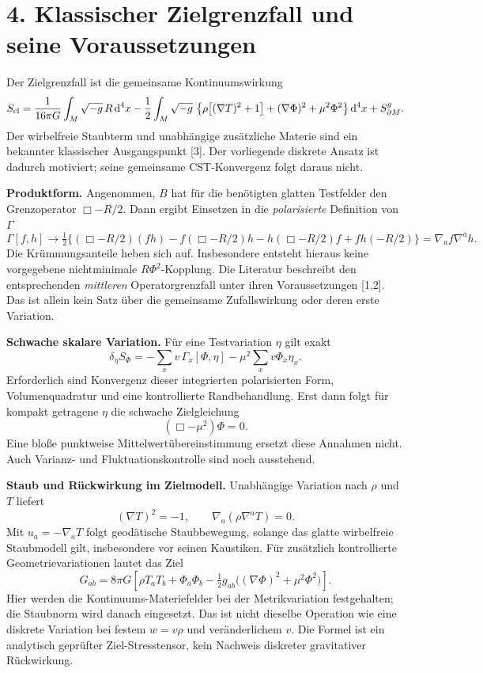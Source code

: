 \documentclass[10pt,a4paper]{article}
\newcommand{\dd}{\mathrm d}
\newcommand{\sect}[1]{\section*{\color{navy}#1}}
\begin{document}
\newpage
\sect{4. Klassischer Zielgrenzfall und seine Voraussetzungen}
Der Zielgrenzfall ist die gemeinsame Kontinuumswirkung
\[
S_{\rm cl}=\frac1{16\pi G}\int_M\sqrt{-g}\,R\,\dd^4x
-\frac12\int_M\sqrt{-g}\,
\left\{\rho\bigl[(\nabla T)^2+1\bigr]
+(\nabla\Phi)^2+\mu^2\Phi^2\right\}\dd^4x+S^g_{\partial M}.
\]
Der wirbelfreie Staubterm und unabhängige zusätzliche Materie sind ein
bekannter klassischer Ausgangspunkt [3]. Der vorliegende diskrete Ansatz
ist dadurch motiviert; seine gemeinsame CST-Konvergenz folgt daraus nicht.

\textbf{Produktform.} Angenommen, $B$ hat für die benötigten glatten
Testfelder den Grenzoperator $\Box-R/2$. Dann ergibt Einsetzen in die
\emph{polarisierte} Definition von $\Gamma$
\[
\Gamma[f,h]\longrightarrow\tfrac12\{
(\Box-R/2)(fh)-f(\Box-R/2)h
-h(\Box-R/2)f+fh(-R/2)\}
=\nabla_af\nabla^ah.
\]
Die Krümmungsanteile heben sich auf. Insbesondere entsteht hieraus keine
vorgegebene nichtminimale $R\Phi^2$-Kopplung.
Die Literatur beschreibt den entsprechenden \emph{mittleren}
Operatorgrenzfall unter ihren Voraussetzungen [1,2]. Das ist allein kein
Satz über die gemeinsame Zufallswirkung oder deren erste Variation.

\textbf{Schwache skalare Variation.} Für eine Testvariation $\eta$ gilt exakt
\[
\delta_\eta S_\Phi=-\sum_xv\,\Gamma_x[\Phi,\eta]
-\mu^2\sum_xv\Phi_x\eta_x.
\]
Erforderlich sind Konvergenz dieser integrierten polarisierten Form,
Volumenquadratur und eine kontrollierte Randbehandlung. Erst dann folgt
für kompakt getragene $\eta$ die schwache Zielgleichung
\[
\boxed{(\Box-\mu^2)\Phi=0.}
\]
Eine bloße punktweise Mittelwertübereinstimmung ersetzt diese Annahmen
nicht. Auch Varianz- und Fluktuationskontrolle sind noch ausstehend.

\textbf{Staub und Rückwirkung im Zielmodell.} Unabhängige Variation nach
$\rho$ und $T$ liefert
\[
(\nabla T)^2=-1,\qquad \nabla_a(\rho\nabla^aT)=0.
\]
Mit $u_a=-\nabla_aT$ folgt geodätische Staubbewegung, solange das glatte
wirbelfreie Staubmodell gilt, insbesondere vor seinen Kaustiken.
Für zusätzlich kontrollierte Geometrievariationen lautet das Ziel
\[
G_{ab}=8\pi G\left[\rho T_aT_b+\Phi_a\Phi_b
-\tfrac12g_{ab}\bigl((\nabla\Phi)^2+\mu^2\Phi^2\bigr)\right].
\]
Hier werden die Kontinuums-Materiefelder bei der Metrikvariation festgehalten;
die Staubnorm wird danach eingesetzt. Das ist nicht dieselbe Operation wie
eine diskrete Variation bei festem $w=v\rho$ und veränderlichem $v$.
Die Formel ist ein analytisch geprüfter Ziel-Stresstensor, kein Nachweis
diskreter gravitativer Rückwirkung.
\end{document}
